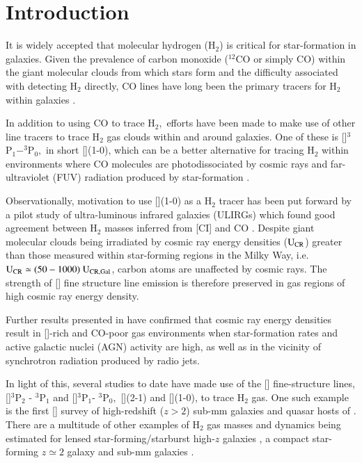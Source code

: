 \section{Introduction}


It is widely accepted that molecular hydrogen (H$_2$) is critical for star-formation in galaxies. Given the prevalence of carbon monoxide ($^{12}$CO or simply CO) within the giant molecular clouds from which stars form and the difficulty associated with detecting H$_2$ directly, CO lines have long been the primary tracers for H$_2$ within galaxies \citep{SolomonvandenBout2005}.

In addition to using CO to trace H$_2,$ efforts have been made to make use of other line tracers to trace H$_2$ gas clouds within and around galaxies. One of these is []$^3$P$_1 - ^3$P$_0,$ in short [](1-0), which can be a better alternative for tracing H$_2$ within environments where CO molecules are photodissociated by cosmic rays and far-ultraviolet (FUV) radiation produced by star-formation \citep{Bisbas2015,Bisbas2017}. 

Observationally, motivation to use [](1-0) as a H$_2$ tracer has been put forward by a pilot study of ultra-luminous infrared galaxies (ULIRGs) which found good agreement between H$_2$ masses inferred from [CI] and CO \citep{PapadopoulosGreve2004}. Despite giant molecular clouds being irradiated by cosmic ray energy densities ($\rm U_{CR}$) greater than those measured within star-forming regions in the Milky Way, i.e. $\rm U_{CR} \simeq (50 - 1000)~U_{CR,Gal}$, carbon atoms are unaffected by cosmic rays. The strength of [] fine structure line emission is therefore preserved in gas regions of high cosmic ray energy density.

Further results presented in \citet{Papadopoulos2018} have confirmed that cosmic ray energy densities result in []-rich and CO-poor gas environments when star-formation rates and active galactic nuclei (AGN) activity are high, as well as in the vicinity of synchrotron radiation produced by radio jets. 

In light of this, several studies to date have made use of the [] fine-structure lines, []$^3$P$_2$ - $^3$P$_1$ and []$^3$P$_1$- $^3$P$_0,$ [](2-1) and [](1-0), to trace H$_2$ gas. One such example is the first [] survey of high-redshift ($z > 2$) sub-mm galaxies and quasar hosts of \citet{Walter2011}. There are a multitude of other examples of H$_2$ gas masses and dynamics being estimated for lensed star-forming/starburst high-$z$ galaxies \citep{Bothwell2017,Andreani2018,Lelli2018,Nesvadba2019}, a compact star-forming $z \simeq 2$ galaxy \citep{Popping2017} and sub-mm galaxies \citep{Alaghband-Zadeh2013}. 

